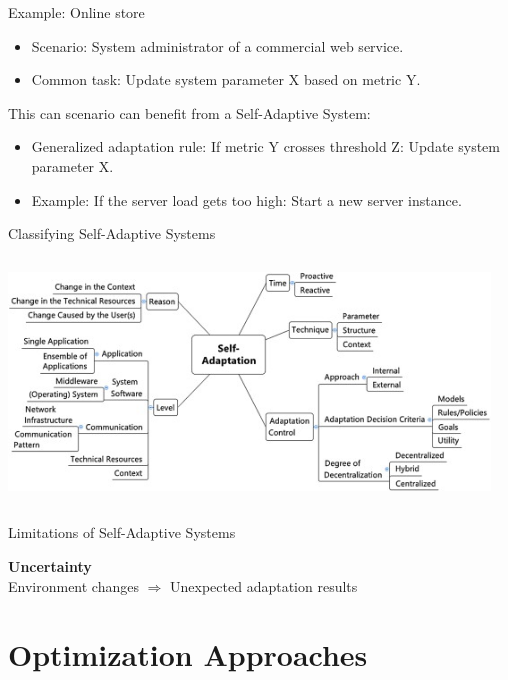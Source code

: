 \documentclass[en,16:9]{sdqbeamer}
\begin{document}
\begin{frame}{Example: Online store}
	\begin{itemize}
		\item Scenario: System administrator of a commercial web service.
		\item Common task: Update system parameter X based on metric Y.
	\end{itemize}
	\medskip
	This can scenario can benefit from a Self-Adaptive System:
	\begin{itemize}
		\item Generalized adaptation rule:
		If metric Y crosses threshold Z: Update system parameter X.
		\item Example: If the server load gets too high: Start a new server instance.
	\end{itemize}
\end{frame}

\begin{frame}{Classifying Self-Adaptive Systems}
	\begin{columns}
		 \begin{center}
			\includegraphics[width=\textwidth]{sources/KrupitzerTaxonomy.jpg}
		\end{center}
		 \cite{SurveyOnEngineeringApproaches}
	\end{columns}
\end{frame}

\begin{frame}{Limitations of Self-Adaptive Systems}
	\begin{center}
		\Large \textbf{Uncertainty}
		\\ \medskip
		Environment changes $\Rightarrow$ Unexpected adaptation results
	\end{center}
\end{frame}

\section{Optimization Approaches}
\end{document}
